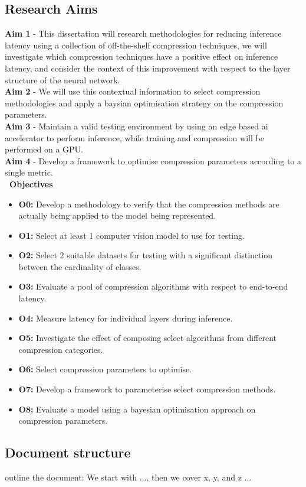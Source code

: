 \documentclass[../D1.tex]{subfiles}
\begin{document}
\subsection{Research Aims}
\textbf{Aim 1}\label{Aim1} - This dissertation will research methodologies for reducing inference latency using a collection of off-the-shelf compression techniques, we will investigate which compression techniques have a positive effect on inference latency, and consider the context of this improvement with respect to the layer structure of the neural network.\\ 
\noindent\textbf{Aim 2}\label{Aim2} - We will use this contextual information to select compression methodologies and apply a baysian optimisation strategy on the compression parameters.\\
\noindent\textbf{Aim 3}\label{Aim3} - Maintain a valid testing environment by using an edge based ai accelerator to perform inference, while training and compression will be performed on a GPU.\\
\noindent\textbf{Aim 4}\label{Aim4} - Develop a framework to optimise compression parameters according to a single metric.\\
\textbf{\large~Objectives}
\begin{itemize}
    \item \textbf{O0:}\label{obj:VerifyComp} Develop a methodology to verify that the compression methods are actually being applied to the model being represented.
    \item \textbf{O1:}\label{obj:ModelSel} Select at least 1 computer vision model to use for testing.
    \item \textbf{O2:}\label{obj:DataSel} Select 2 suitable datasets for testing with a significant distinction between the  cardinality of classes.
    \item \textbf{O3:}\label{obj:EvalE2E} Evaluate a pool of compression algorithms with respect to end-to-end latency.
    \item \textbf{O4:}\label{obj:EvalLayer} Measure latency for individual layers during inference.
    \item \textbf{O5:}\label{obj:EvalComp} Investigate the effect of composing select algorithms from different compression categories. 
    \item \textbf{O6:}\label{obj:ParaSel} Select compression parameters to optimise.
    \item \textbf{O7:}\label{obj:CompPara} Develop a framework to parameterise select compression methods.
    \item \textbf{O8:}\label{obj:TestOpt} Evaluate a model using a bayesian optimisation approach on compression parameters.
\end{itemize}

\subsection{Document structure}

outline the document: We start with ..., then we cover x, y, and z ...
\end{document}

